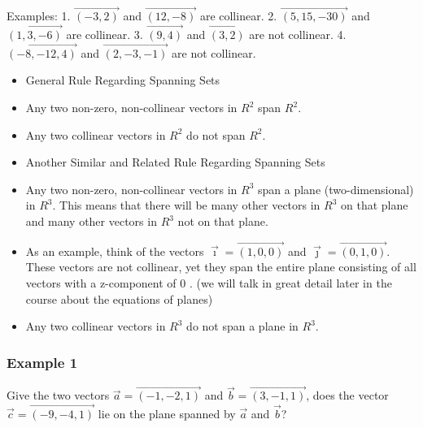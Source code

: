 \documentclass{article}
\begin{document}
Examples:
1. $\overrightarrow{(-3,2)}$ and $\overrightarrow{(12,-8)}$ are collinear.
2. $\overrightarrow{(5,15,-30)}$ and $\overrightarrow{(1,3,-6)}$ are collinear.
3. $\overrightarrow{(9,4)}$ and $\overrightarrow{(3,2)}$ are not collinear.
4. $\overrightarrow{(-8,-12,4)}$ and $\overrightarrow{(2,-3,-1)}$ are not collinear.
\begin{tcolorbox}[enhanced,frame style image=blueshade.png,
  opacityback=0.75,opacitybacktitle=0.25,
  colback=blue!5!white,colframe=blue!75!black]
  \begin{itemize}
      \item General Rule Regarding Spanning Sets
      \item Any two non-zero, non-collinear vectors in $R^2$ span $R^2$.
\item Any two collinear vectors in $R^2$ do not span $R^2$.
  \end{itemize}
\end{tcolorbox}
\begin{tcolorbox}[enhanced,frame style image=blueshade.png,
  opacityback=0.75,opacitybacktitle=0.25,
  colback=blue!5!white,colframe=blue!75!black] 
  \begin{itemize}
      \item Another Similar and Related Rule Regarding Spanning Sets
\item Any two non-zero, non-collinear vectors in $R^3$ span a plane (two-dimensional) in $R^3$. This means that there will be many other vectors in $R^3$ on that plane and many other vectors in $R^3$ not on that plane.
\item As an example, think of the vectors $\vec{\imath}=\overrightarrow{(1,0,0)}$ and $\vec{\jmath}=\overrightarrow{(0,1,0)}$. These vectors are not collinear, yet they span the entire plane consisting of all vectors with a z-component of 0 . (we will talk in great detail later in the course about the equations of planes)
\item 
Any two collinear vectors in $R^3$ do not span a plane in $R^3$.
  \end{itemize}
\end{tcolorbox}

\subsubsection{Example 1}
Give the two vectors $\vec{a}=\overrightarrow{(-1,-2,1)}$ and $\vec{b}=\overrightarrow{(3,-1,1)}$, does the vector $\vec{c}=\overrightarrow{(-9,-4,1)}$ lie on the plane spanned by $\vec{a}$ and $\vec{b}$?
\end{document}
